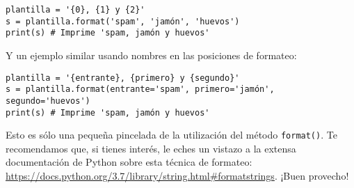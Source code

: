 \begin{lstlisting}
plantilla = '{0}, {1} y {2}'
s = plantilla.format('spam', 'jamón', 'huevos')
print(s) # Imprime 'spam, jamón y huevos'
\end{lstlisting}

Y un ejemplo similar usando nombres en las posiciones de formateo:

\begin{lstlisting}
plantilla = '{entrante}, {primero} y {segundo}'
s = plantilla.format(entrante='spam', primero='jamón', segundo='huevos')
print(s) # Imprime 'spam, jamón y huevos'
\end{lstlisting}

Esto es sólo una pequeña pincelada de la utilización del método \texttt{format()}. Te recomendamos que, si tienes interés, le eches un vistazo a la extensa documentación de Python sobre esta técnica de formateo: \url{https://docs.python.org/3.7/library/string.html#formatstrings}. ¡Buen provecho!
